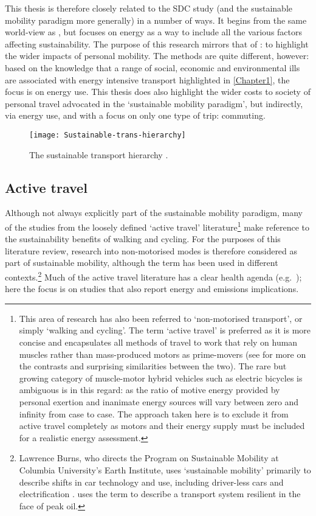This thesis is therefore closely related to the SDC study (and
the sustainable mobility paradigm more generally) in a number of ways.
It begins from the same world-view as \citet{Banister2008}, but
focuses on energy as a way to include all the various
factors affecting sustainability. The purpose of this research mirrors
that of \citet{Kay2011}:  to highlight the wider impacts of
personal mobility.
The methods are quite different, however: based 
on the knowledge that a range of social, economic and environmental ills are
associated with energy intensive transport highlighted in \cref{Chapter1}, the focus
is on
energy use. This thesis does also
highlight the wider costs to society of personal travel advocated
in the `sustainable mobility paradigm', but indirectly,
via energy use, and with a focus on only one type of trip: commuting.

\begin{figure}[htbp]
  \centerline{
    \texttt{[image: Sustainable-trans-hierarchy]}}
  \caption{The sustainable transport hierarchy \citep{Kay2011}.} %
  \label{fsdc}
\end{figure}

\subsection{Active travel} \label{sactive}
Although not always explicitly part of the sustainable mobility
paradigm, many of the studies from the loosely defined `active travel'
literature\footnote{This
area of
research has also been referred to `non-motorised transport', or simply
`walking and cycling'. The term `active travel' is preferred as it is more
concise and encapsulates all methods of travel to work that rely on human
muscles rather than mass-produced motors as prime-movers (see
\citealp{Smil2008} for more on the contrasts and surprising similarities between
the two). The rare but growing category of muscle-motor hybrid vehicles such as
electric bicycles is ambiguous is in this regard: as the ratio of motive energy
provided by personal exertion and inanimate energy sources will vary between
zero and infinity from case to case. The approach taken here is to exclude it
from active travel completely as motors and their energy supply must be
included for a realistic energy assessment.
}
make reference to the sustainability benefits of walking and cycling. For
the purposes of this literature review, research into non-motorised modes is
therefore considered as part of sustainable mobility,
although the term has been used in different
contexts.\footnote{Lawrence Burns, who directs the Program on Sustainable
Mobility at Columbia University's Earth Institute,
uses `sustainable mobility' primarily to describe shifts in
car technology and use, including driver-less cars and electrification \citet{Burns2013}.
\citet{Aftabuzzaman2011} uses the term to describe a transport system
resilient in the face of peak oil.
}
Much
of the active travel literature
has a clear health agenda (e.g.~\citealp{Jarrett2012}); here the focus is
on studies that also report energy and emissions implications.

